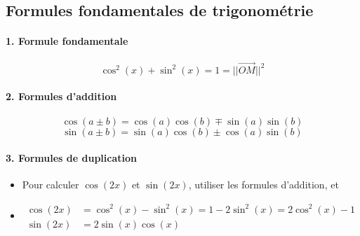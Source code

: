 \documentclass{report}
\begin{document}

      \subsection{Formules fondamentales de trigonométrie}

        \paragraph{1. Formule fondamentale}
        \[
        \cos^2(x) + \sin^2(x) = 1 = ||\vec{OM}||^2
        \]

        \iffalse\paragraph{2. Formules de dérivées}
        \[
        \sin'(x) = \cos(x)
        \qquad
        \cos'(x)= -\sin(x)
        \]\fi

        \iffalse\paragraph{2. Limites usuelles}
        \[
        \lim_{x \to 0} \frac{\sin(x)}{x} = 1
        \qquad
        \lim_{x \to 0} \frac{\tan(x)}{x} = 1
        \qquad
        \lim_{x \to 0} \frac{1 - \cos(x)}{x} = 0
        \]\fi

        \paragraph{2. Formules d'addition}
        \[
        \cos(a \pm b) = \cos(a)\cos(b) \mp \sin(a)\sin(b)
        \]
        \[
        \sin(a \pm b) = \sin(a)\cos(b) \pm \cos(a)\sin(b)
        \]

        \paragraph{3. Formules de duplication}
        \begin{itemize}
          \item Pour calculer $\cos(2x)$ et $\sin(2x)$, utiliser les formules d'addition, et 
          \item \begin{align*}
                  \cos(2x) &= \cos^2(x) - \sin^2(x) = 1 - 2\sin^2(x) = 2\cos^2(x)-1 \\
                  \sin(2x) &= 2\sin(x)\cos(x) 
                \end{align*}
        \end{itemize}
\end{document}
